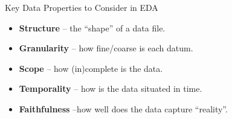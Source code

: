 \documentclass[aspectratio=169]{../latex_main/tntbeamer}  %
\begin{document}
\begin{frame}[c]{Key Data Properties to Consider in EDA}
    \begin{itemize}
        \item \textbf{Structure} -- the “shape” of a data file.
        \item \textbf{Granularity} -- how fine/coarse is each datum.
        \item \textbf{Scope} -- how (in)complete is the data.
        \item \textbf{Temporality} -- how is the data situated in time.
        \item \textbf{Faithfulness} --how well does the data capture “reality”.
    \end{itemize}
\end{frame}

	
\end{document}
